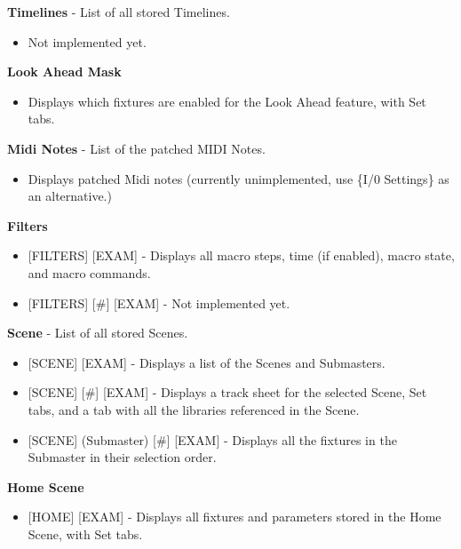 \documentclass[
]{article}
\providecommand{\tightlist}{%
  \setlength{\itemsep}{0pt}\setlength{\parskip}{0pt}}
\begin{document}
\textbf{Timelines} - List of all stored Timelines.

\begin{itemize}
\tightlist
\item
  {Not implemented yet.}
\end{itemize}

\textbf{Look Ahead Mask}

\begin{itemize}
\tightlist
\item
  Displays which fixtures are enabled for the Look Ahead feature, with Set tabs.
\end{itemize}

\textbf{Midi Notes} - List of the patched MIDI Notes.

\begin{itemize}
\tightlist
\item
  {Displays patched Midi notes (currently unimplemented, use \{I/0 Settings\} as an alternative.) }
\end{itemize}

\textbf{Filters}

\begin{itemize}
\item
  {[}FILTERS{]} {[}EXAM{]} - Displays all macro steps, time (if enabled), macro state, and macro commands.
\item
  {[}FILTERS{]} {[}\#{]} {[}EXAM{]} - {Not implemented yet.}
\end{itemize}

\textbf{Scene} - List of all stored Scenes.

\begin{itemize}
\item
  {[}SCENE{]} {[}EXAM{]} - Displays a list of the Scenes and Submasters.
\item
  {[}SCENE{]} {[}\#{]} {[}EXAM{]} - Displays a track sheet for the selected Scene, Set tabs, and a tab with all the libraries referenced in the Scene.
\item
  {[}SCENE{]} (Submaster) {[}\#{]} {[}EXAM{]} - Displays all the fixtures in the Submaster in their selection order.
\end{itemize}

\textbf{Home Scene}

\begin{itemize}
\tightlist
\item
  {[}HOME{]} {[}EXAM{]} - Displays all fixtures and parameters stored in the Home Scene, with Set tabs.
\end{itemize}
\end{document}
